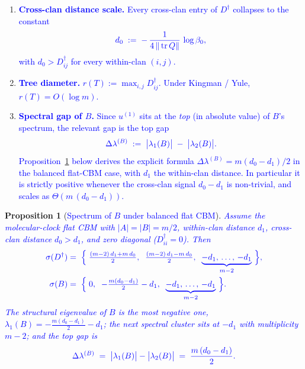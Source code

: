 \documentclass[11pt]{article}
\newcommand{\new}[1]{\textcolor{blue}{#1}}
\newcommand{\newmath}[1]{{\color{blue} #1}}
\newtheorem{proposition}[theorem]{Proposition}
\theoremstyle{remark}
\newcommand{\1}{\mathbf{1}}
\newcommand{\Tr}{\operatorname{tr}}
\newcommand{\Ddist}{D^{\dagger}}      %
\newcommand{\Bop}{B}
\newcommand{\rT}{r(T)}                %
\begin{document}
\begin{enumerate}
  \item \new{\textbf{Cross-clan distance scale.} Every cross-clan entry
        of $\Ddist$ collapses to the constant}
        \begin{equation}
        \newmath{
          d_{0} \;:=\; -\,\frac{1}{4\,\|\Tr Q\|}\,\log \beta_{0},
        }
        \end{equation}
        \new{with $d_{0} > \Ddist_{ij}$ for every within-clan $(i,j)$.}
  \item \new{\textbf{Tree diameter.}
        $\rT := \max_{i,j} \Ddist_{ij}$.
        Under Kingman / Yule, $\rT = O(\log m)$.}
  \item \new{\textbf{Spectral gap of $\Bop$.} Since $u^{(1)}$ sits at the
        \emph{top} (in absolute value) of $\Bop$'s spectrum, the relevant
        gap is the top gap}
        \begin{equation}
        \newmath{
          \Delta\lambda^{(B)} \;:=\; \big|\lambda_{1}(\Bop)\big| \;-\; \big|\lambda_{2}(\Bop)\big|.
        }
        \end{equation}
        \new{Proposition~\ref{prop:cbm-gap} below derives the explicit
        formula $\Delta\lambda^{(B)} = m(d_{0} - d_{1})/2$ in the
        balanced flat-CBM case, with $d_{1}$ the within-clan distance.
        In particular it is strictly positive whenever the cross-clan
        signal $d_{0} - d_{1}$ is non-trivial, and scales as
        $\Theta(m\,(d_{0} - d_{1}))$.}
\end{enumerate}

\begin{proposition}[\new{Spectrum of $\Bop$ under balanced flat CBM}]
\label{prop:cbm-gap}
\new{Assume the molecular-clock flat CBM with $|A| = |B| = m/2$,
within-clan distance $d_{1}$, cross-clan distance $d_{0} > d_{1}$, and
zero diagonal ($\Ddist_{ii} = 0$). Then}
\begin{align}
\newmath{
  \sigma(\Ddist) \;
} &
\newmath{
  =\; \Big\{\; \tfrac{(m-2)\,d_{1} + m\,d_{0}}{2},\;\;
            \tfrac{(m-2)\,d_{1} - m\,d_{0}}{2},\;\;
            \underbrace{-d_{1},\,\dots,\,-d_{1}}_{m-2}\,\Big\},
} \\
\newmath{
  \sigma(\Bop) \;
} &
\newmath{
  =\; \Big\{\; 0,\;\; -\tfrac{m(d_{0} - d_{1})}{2} - d_{1},\;\;
            \underbrace{-d_{1},\,\dots,\,-d_{1}}_{m-2}\,\Big\}.
}
\end{align}
\new{The structural eigenvalue of $\Bop$ is the most negative one,
$\lambda_{1}(\Bop) = -\tfrac{m(d_{0} - d_{1})}{2} - d_{1}$; the next
spectral cluster sits at $-d_{1}$ with multiplicity $m - 2$; and the
top gap is}
\begin{equation}
\newmath{
  \Delta\lambda^{(B)}
  \;=\; \big|\lambda_{1}(\Bop)\big| - \big|\lambda_{2}(\Bop)\big|
  \;=\; \frac{m\,(d_{0} - d_{1})}{2}.
}
\label{eq:gap-balanced}
\end{equation}
\end{proposition}
\end{document}
